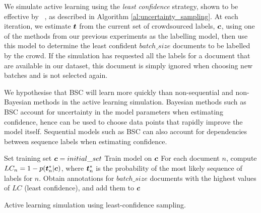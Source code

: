   We simulate active learning using 
 the \emph{least confidence} strategy, shown to be effective by 
 ~\citet{settles2008analysis},
 as described in Algorithm \ref{al:uncertainty_sampling}.
At each iteration, we estimate $\boldsymbol t$ from the current set of 
  crowdsourced labels, $\boldsymbol c$,
  using one of the methods from 
  our previous experiments as the labelling model,
  then use this model to determine the least confident $batch\_size$ 
 documents to be labelled by the crowd. 
  If the simulation has requested all the labels for a document that
  are available in our dataset, this document is simply ignored when 
  choosing new batches
  and is not selected again.
 
 We hypothesise that BSC will learn more quickly than non-sequential 
 and non-Bayesian methods
 in the active learning simulation. 
 Bayesian methods such as BSC account for uncertainty in the model parameters when estimating confidence,  
 hence can be used to choose data points that rapidly improve
 the model itself.
 Sequential models such as BSC can also account for dependencies between sequence labels
 when estimating confidence.
 
 \begin{algorithm}
 \DontPrintSemicolon
  \nl Set training set $\boldsymbol c=initial\_set$ \;
  {
  \nl Train model on $\boldsymbol c$ \;
  \nl For each document $n$, 
  compute $LC_n = 1-p(\boldsymbol t_n^*|\boldsymbol c)$, where $\boldsymbol t_n^*$ is the probability of the most likely sequence of labels 
  for $n$. \;
  \nl Obtain annotations for $batch\_size$ documents with the highest values of $LC$ (least confidence), and add them to $\boldsymbol c$\;
  }
 \caption{Active learning simulation using least-confidence sampling.}
 \label{al:uncertainty_sampling}
 \end{algorithm}
 

